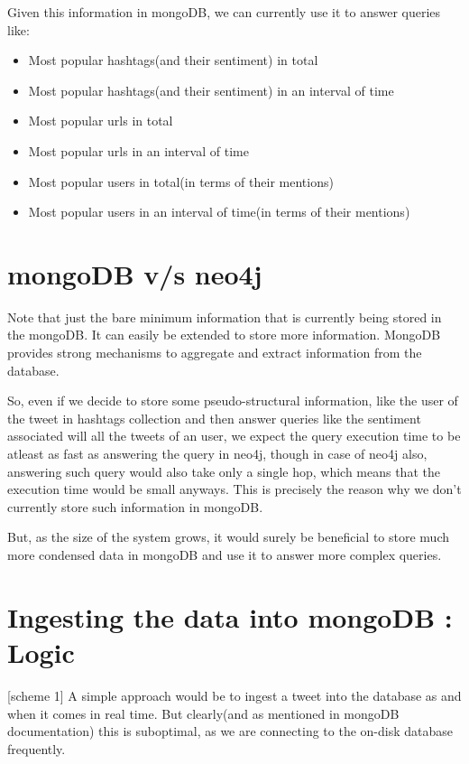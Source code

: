 \documentclass[letterpaper,10pt,english]{sphinxmanual}
\begin{document}
Given this information in mongoDB, we can currently use it to answer queries like:
\begin{itemize}
\item {} 
Most popular hashtags(and their sentiment) in total

\item {} 
Most popular hashtags(and their sentiment) in an interval of time

\item {} 
Most popular urls in total

\item {} 
Most popular urls in an interval of time

\item {} 
Most popular users in total(in terms of their mentions)

\item {} 
Most popular users in an interval of time(in terms of their mentions)

\end{itemize}


\section{mongoDB v/s neo4j}
\label{\detokenize{mongoDB_data_ingestion:mongodb-v-s-neo4j}}
Note that just the bare minimum information that is currently being stored in the mongoDB. It can easily be extended to store more information. MongoDB provides strong mechanisms to aggregate and extract information
from the database.

So, even if we decide to store some pseudo-structural information, like the user of the tweet in hashtags collection and then answer queries like the sentiment associated will all the tweets of an user, we expect the query execution time to be atleast as fast as answering the query in neo4j, though in case of neo4j also, answering such query would also take only a single hop, which means that the execution time would be small anyways. This is precisely the reason why we don’t currently store such information in mongoDB.

But, as the size of the system grows, it would surely be beneficial to store much more condensed data in mongoDB and use it to answer more complex queries.


\section{Ingesting the data into mongoDB : Logic}
\label{\detokenize{mongoDB_data_ingestion:ingesting-the-data-into-mongodb-logic}}
{[}scheme 1{]} A simple approach would be to ingest a tweet into the database as and when it comes in real time. But clearly(and as mentioned in mongoDB documentation) this is suboptimal, as we are connecting to the on-disk database frequently.
\end{document}

